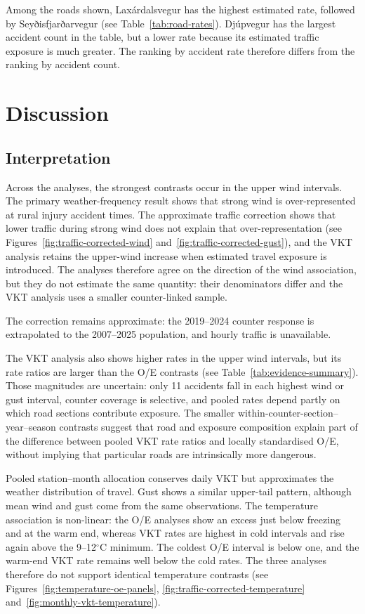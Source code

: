 

Among the roads shown, Laxárdalsvegur has the highest estimated rate,
followed by Seyðisfjarðarvegur (see Table~\ref{tab:road-rates}). Djúpvegur has the
largest accident count in the table, but a lower rate because its
estimated traffic exposure is much greater. The ranking by accident
rate therefore differs from the ranking by accident count.

\chapter{Discussion}

\section{Interpretation}

Across the analyses, the strongest contrasts occur in the upper wind intervals. The primary weather-frequency result shows that strong wind is over-represented at rural injury accident times. The approximate traffic correction shows that lower traffic during strong wind does not explain that over-representation (see Figures~\ref{fig:traffic-corrected-wind} and~\ref{fig:traffic-corrected-gust}), and the VKT analysis retains the upper-wind increase when estimated travel exposure is introduced. The analyses therefore agree on the direction of the wind association, but they do not estimate the same quantity: their denominators differ and the VKT analysis uses a smaller counter-linked sample.

The correction remains approximate: the 2019--2024 counter response is extrapolated to the 2007--2025 population, and hourly traffic is unavailable.

The VKT analysis also shows higher rates in the upper wind
intervals, but its rate ratios are larger than the O/E contrasts
(see Table~\ref{tab:evidence-summary}). Those
magnitudes are uncertain: only 11 accidents fall in each highest wind or gust
interval, counter coverage is selective, and pooled rates
depend partly on which road sections contribute exposure. The smaller
within-counter-section--year--season contrasts suggest that road and exposure
composition explain part of the difference between pooled VKT rate ratios and
locally standardised O/E, without implying that particular roads are
intrinsically more dangerous.

Pooled station--month allocation conserves daily VKT but approximates the weather distribution of travel. Gust shows a similar upper-tail pattern, although mean wind and gust come from the same observations. The temperature association is non-linear: the O/E analyses show an excess just below freezing and at the warm end, whereas VKT rates are highest in cold intervals and rise again above the 9--12$^{\circ}$C minimum. The coldest O/E interval is below one, and the warm-end VKT rate remains well below the cold rates. The three analyses therefore do not support identical temperature contrasts (see Figures~\ref{fig:temperature-oe-panels}, \ref{fig:traffic-corrected-temperature} and~\ref{fig:monthly-vkt-temperature}).

